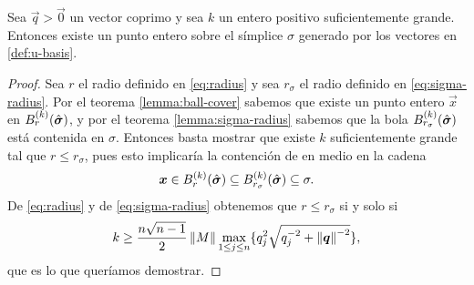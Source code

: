 \begin{theorem}
	\label{th:intsimplex}
	Sea $\vec{q} > \vec{0}$ un vector coprimo y sea $k$ un entero positivo suficientemente grande.
	Entonces existe un punto entero sobre el símplice $\sigma$ generado por los vectores en
	\eqref{def:u-basis}.
\end{theorem}
\begin{proof}
	Sea $r$ el radio definido en \eqref{eq:radius} y sea $r_\sigma$ el radio definido en
	\eqref{eq:sigma-radius}. Por el teorema \ref{lemma:ball-cover} sabemos que existe un punto
	entero $\vec{x}$ en $B_r^{(k)}(\hat{\boldsymbol{ \sigma }})$, y por el teorema \ref{lemma:sigma-radius} sabemos
	que la bola $B_{r_\sigma}^{(k)}(\hat{\boldsymbol{ \sigma }})$ está contenida en $\sigma$. Entonces basta
	mostrar que existe $k$ suficientemente grande tal que $r \leq r_\sigma$, pues esto implicaría la
	contención de en medio en la cadena
	\begin{equation*}
		\boldsymbol{x} \in B_r^{(k)}(\hat{\boldsymbol{ \sigma }}) \subseteq B_{r_\sigma}^{(k)}(\hat{\boldsymbol{ \sigma }}) \subseteq \sigma.
	\end{equation*}
	De \eqref{eq:radius} y de \eqref{eq:sigma-radius} obtenemos que $r \leq r_\sigma$ si y solo si
	\begin{equation}
		\label{eq:eta-limit}
		k \geq \frac{n\sqrt{n - 1}}{2}\left\lVert M \right\rVert \max_{1 \leq j \leq n} \lbrace q_j^2 \sqrt{q_j^{-2} + \left\lVert \boldsymbol{q} \right\rVert^{-2}} \rbrace,
	\end{equation}
	que es lo que queríamos demostrar.
\end{proof}

